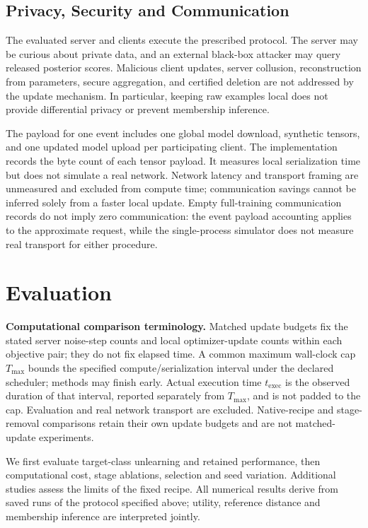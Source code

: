 \documentclass[software,article,submit,moreauthors]{Definitions/mdpi}
\begin{document}
\subsection{Privacy, Security and Communication}
\label{sec:threat}
The evaluated server and clients execute the prescribed protocol. The server
may be curious about private data, and an external black-box attacker may query
released posterior scores. Malicious client updates, server collusion,
reconstruction from parameters, secure aggregation, and certified deletion are
not addressed by the update mechanism. In particular, keeping raw examples local
does not provide differential privacy or prevent membership inference.

The payload for one event includes one global model download, synthetic tensors,
and one updated model upload per participating client. The implementation records
the byte count of each tensor payload. It measures local serialization time but
does not simulate a real network. Network latency and transport framing are
unmeasured and excluded from compute time; communication savings cannot be
inferred solely from a faster local update.
Empty full-training communication records do not imply zero communication:
the event payload accounting applies to the approximate request, while the
single-process simulator does not measure real transport for either procedure.
\section{Evaluation}
\noindent\textbf{Computational comparison terminology.}
Matched update budgets fix the stated server noise-step counts and local
optimizer-update counts within each objective pair; they do not fix elapsed
time. A common maximum wall-clock cap $T_{\max}$ bounds the specified
compute/serialization interval under the declared scheduler; methods may finish
early. Actual execution time $t_{\mathrm{exec}}$ is the observed duration of
that interval, reported separately from $T_{\max}$, and is not padded to the
cap. Evaluation and real network transport are excluded. Native-recipe and
stage-removal comparisons retain their own update budgets and are not
matched-update experiments.\par

\label{sec:evaluation}\label{sec:results}

We first evaluate target-class unlearning and retained performance, then
computational cost, stage ablations, selection and seed variation. Additional
studies assess the limits of the fixed recipe. All numerical results derive
from saved runs of the protocol specified above; utility, reference distance
and membership inference are interpreted jointly.
\end{document}
